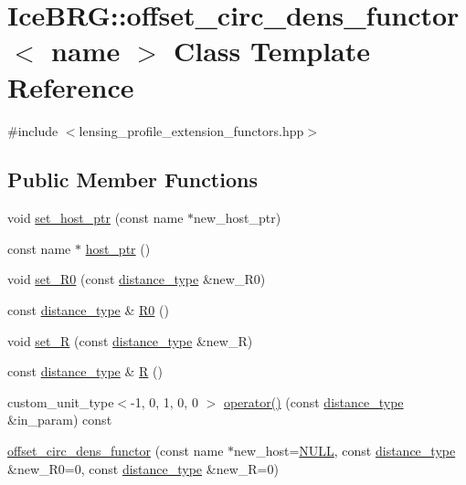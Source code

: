 \hypertarget{classIceBRG_1_1offset__circ__dens__functor}{\section{Ice\-B\-R\-G\-:\-:offset\-\_\-circ\-\_\-dens\-\_\-functor$<$ name $>$ Class Template Reference}
\label{classIceBRG_1_1offset__circ__dens__functor}
}


{\ttfamily \#include $<$lensing\-\_\-profile\-\_\-extension\-\_\-functors.\-hpp$>$}

\subsection*{Public Member Functions}
\begin{DoxyCompactItemize}
\item 
void \hyperlink{classIceBRG_1_1offset__circ__dens__functor_ad3482bde1a5e93af9f0c735a826d58a8}{set\-\_\-host\-\_\-ptr} (const name $\ast$new\-\_\-host\-\_\-ptr)
\item 
const name $\ast$ \hyperlink{classIceBRG_1_1offset__circ__dens__functor_a88cdff42c46c90342f06d0ffca4a9ba2}{host\-\_\-ptr} ()
\item 
void \hyperlink{classIceBRG_1_1offset__circ__dens__functor_ab411bc3a5f90438879f244f3843fd068}{set\-\_\-\-R0} (const \hyperlink{namespaceIceBRG_a45499647eb87e24c10ab32c628711cec}{distance\-\_\-type} \&new\-\_\-\-R0)
\item 
const \hyperlink{namespaceIceBRG_a45499647eb87e24c10ab32c628711cec}{distance\-\_\-type} \& \hyperlink{classIceBRG_1_1offset__circ__dens__functor_a5c12b0eb12bdfdf95eac9d20fac98f7c}{R0} ()
\item 
void \hyperlink{classIceBRG_1_1offset__circ__dens__functor_a761a4a76394476f484953ebac9c5c748}{set\-\_\-\-R} (const \hyperlink{namespaceIceBRG_a45499647eb87e24c10ab32c628711cec}{distance\-\_\-type} \&new\-\_\-\-R)
\item 
const \hyperlink{namespaceIceBRG_a45499647eb87e24c10ab32c628711cec}{distance\-\_\-type} \& \hyperlink{classIceBRG_1_1offset__circ__dens__functor_a2b76922c77ba42400bc8e82bcc94e3be}{R} ()
\item 
custom\-\_\-unit\-\_\-type$<$-\/1, 0, 1, 0, 0 $>$ \hyperlink{classIceBRG_1_1offset__circ__dens__functor_a8b9fda572534c46cbe33851d775100f0}{operator()} (const \hyperlink{namespaceIceBRG_a45499647eb87e24c10ab32c628711cec}{distance\-\_\-type} \&in\-\_\-param) const 
\item 
\hyperlink{classIceBRG_1_1offset__circ__dens__functor_a4cd1ff81a3ca4d67f8b1fc8bd4a670f7}{offset\-\_\-circ\-\_\-dens\-\_\-functor} (const name $\ast$new\-\_\-host=\hyperlink{lib_2IceBRG__main_2common_8h_a070d2ce7b6bb7e5c05602aa8c308d0c4}{N\-U\-L\-L}, const \hyperlink{namespaceIceBRG_a45499647eb87e24c10ab32c628711cec}{distance\-\_\-type} \&new\-\_\-\-R0=0, const \hyperlink{namespaceIceBRG_a45499647eb87e24c10ab32c628711cec}{distance\-\_\-type} \&new\-\_\-\-R=0)
\end{DoxyCompactItemize}


